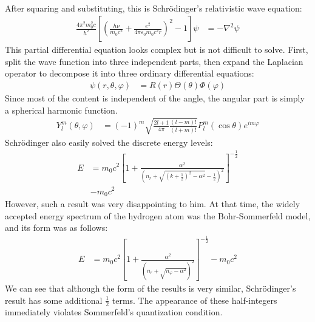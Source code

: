 \documentclass[a4paper, 12pt, oneside, onecolumn]{article}
\begin{document}
\begin{multicols}{2}
\begin{align}
\end{align}
After squaring and substituting, this is Schrödinger's relativistic wave equation:
\begin{align}
	\frac{4 \pi^2 m_0^2 c}{h^2} \left[ \left( \frac{h \nu}{m_0 c^2} + \frac{e^2}{4 \pi \varepsilon_0 m_0 c^2 r} \right)^2 - 1 \right] \psi
	&= - \nabla^2 \psi
\end{align}
This partial differential equation looks complex but is not difficult to solve. First, split the wave function into three independent parts, then expand the Laplacian operator to decompose it into three ordinary differential equations:
\begin{align}
	\psi \left( r, \theta, \varphi \right)
	&= R \left( r \right) \Theta \left( \theta \right) \Phi \left( \varphi \right)
\end{align}
Since most of the content is independent of the angle, the angular part is simply a spherical harmonic function.
\begin{align}
	Y_l^m \left( \theta, \varphi \right)
	&= \left( -1 \right)^m \sqrt{\frac{2 l + 1}{4 \pi} \frac{\left( l - m \right)!}{\left( l + m \right)!}} P_{l}^m \left( \cos \theta \right) e^{i m \varphi}
\end{align}
Schrödinger also easily solved the discrete energy levels:
\begin{align}
	E
	&= m_0 c^2 \left[ 1 + \frac{\alpha^2}{\left( n_r + \sqrt{\left( k + \frac{1}{2} \right)^2 - \alpha^2} - \frac{1}{2} \right)^2} \right]^{- \frac{1}{2}} \nonumber \\ 
	&- m_0 c^2
\end{align}
However, such a result was very disappointing to him. At that time, the widely accepted energy spectrum of the hydrogen atom was the Bohr-Sommerfeld model, and its form was as follows:
\begin{align}
	E
	&= m_0 c^2 \left[ 1 + \frac{\alpha^2}{\left( n_r + \sqrt{n_{\varphi} - \alpha^2} \right)^2} \right]^{- \frac{1}{2}} - m_0 c^2
\end{align}
We can see that although the form of the results is very similar, Schrödinger's result has some additional $\frac{1}{2}$ terms. The appearance of these half-integers immediately violates Sommerfeld's quantization condition.


\end{multicols}
\end{document}
